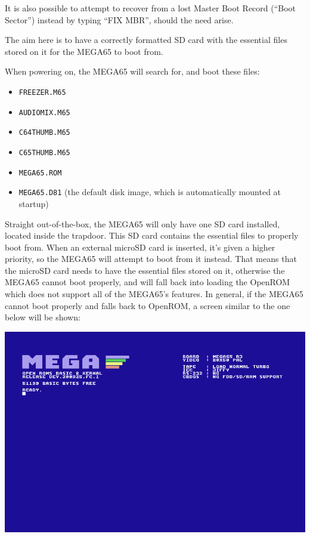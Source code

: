 It is also possible to attempt to recover from a lost Master Boot
Record (``Boot Sector'') instead by typing ``FIX MBR'', should the
need arise.

The aim here is to have a correctly formatted SD card with the essential files stored on it for the MEGA65 to boot from.

When powering on, the MEGA65 will search for, and boot these files:
\begin{itemize}
\item {\tt FREEZER.M65}
\item {\tt AUDIOMIX.M65}
\item {\tt C64THUMB.M65}
\item {\tt C65THUMB.M65}
\item {\tt MEGA65.ROM}
\item {\tt MEGA65.D81} (the default disk image, which is automatically mounted at startup)
\end{itemize}

Straight out-of-the-box, the MEGA65 will only have one SD card installed, located inside the trapdoor. This SD card contains the essential files to properly boot from.
When an external microSD card is inserted, it's given a higher priority, so the MEGA65 will attempt to boot from it instead.
That means that the microSD card needs to have the essential files stored on it, otherwise the MEGA65 cannot boot properly, and will fall back into loading the OpenROM which does not support all of the MEGA65's features.
In general, if the MEGA65 cannot boot properly and falls back to OpenROM, a screen similar to the one below will be shown:

\includegraphics[width=\linewidth]{images/mega65_OpenROM_boot_noSD.png}


